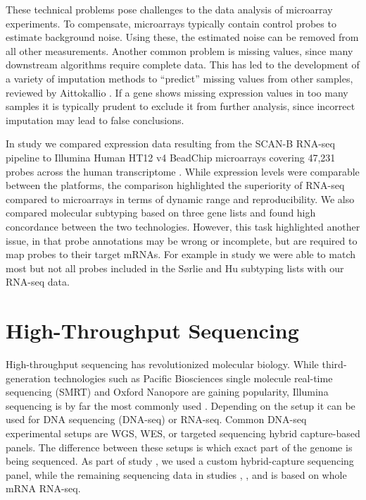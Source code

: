 \documentclass[11pt]{book}
\newcommand{\scanb}{\mbox{SCAN-B}}
\begin{document}
These technical problems pose challenges to the data analysis of microarray experiments. To compensate, microarrays typically contain control probes to estimate background noise. Using these, the estimated noise can be removed from all other measurements. Another common problem is missing values, since many downstream algorithms require complete data. This has led to the development of a variety of imputation methods to ``predict'' missing values from other samples, reviewed by Aittokallio \cite{Aittokallio:2009}. If a gene shows missing expression values in too many samples it is typically prudent to exclude it from further analysis, since incorrect imputation may lead to false conclusions.

In study \I we compared expression data resulting from the \scanb{} RNA-seq pipeline to Illumina Human HT12 v4 BeadChip microarrays covering 47,231 probes across the human transcriptome \cite{illumina-ht12-sheet}. While expression levels were comparable between the platforms, the comparison highlighted the superiority of RNA-seq compared to microarrays in terms of dynamic range and reproducibility. We also compared molecular subtyping based on three gene lists and found high concordance between the two technologies. However, this task highlighted another issue, in that probe annotations may be wrong or incomplete, but are required to map probes to their target mRNAs. For example in study \I we were able to match most but not all probes included in the Sørlie \cite{Sorlie:2003} and Hu \cite{Hu:2006} subtyping lists with our RNA-seq data.


\section{High-Throughput Sequencing}
\label{subsec:sequencing-by-synthesis}

High-throughput sequencing has revolutionized molecular biology. While third-generation technologies such as Pacific Biosciences single molecule real-time sequencing (SMRT) and Oxford Nanopore are gaining popularity, Illumina sequencing is by far the most commonly used \cite{Reuter:2015}. Depending on the setup it can be used for DNA sequencing (DNA-seq) or RNA-seq. Common DNA-seq experimental setups are WGS, WES, or targeted sequencing hybrid capture-based panels. The difference between these setups is which exact part of the genome is being sequenced. As part of study \IV, we used a custom hybrid-capture sequencing panel, while the remaining sequencing data in studies \I, \III, and \IV is based on whole mRNA RNA-seq.
\end{document}
